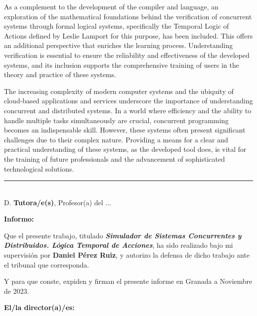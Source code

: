 As a complement to the development of the compiler and language, an exploration of the mathematical foundations behind the verification of concurrent systems through formal logical systems, specifically the Temporal Logic of Actions defined by Leslie Lamport for this purpose, has been included. This offers an additional perspective that enriches the learning process. Understanding verification is essential to ensure the reliability and effectiveness of the developed systems, and its inclusion supports the comprehensive training of users in the theory and practice of these systems.

The increasing complexity of modern computer systems and the ubiquity of cloud-based applications and services underscore the importance of understanding concurrent and distributed systems. In a world where efficiency and the ability to handle multiple tasks simultaneously are crucial, concurrent programming becomes an indispensable skill. However, these systems often present significant challenges due to their complex nature. Providing a means for a clear and practical understanding of these systems, as the developed tool does, is vital for the training of future professionals and the advancement of sophisticated technological solutions.



\cleardoublepage

\thispagestyle{empty}

\noindent\rule[-1ex]{\textwidth}{2pt}\\[4.5ex]

D. \textbf{Tutora/e(s)}, Profesor(a) del ...

\vspace{0.5cm}

\textbf{Informo:}

\vspace{0.5cm}

Que el presente trabajo, titulado \textit{\textbf{Simulador de Sistemas Concurrentes y Distribuidos. Lógica Temporal de Acciones}},
ha sido realizado bajo mi supervisión por \textbf{Daniel Pérez Ruiz}, y autorizo la defensa de dicho trabajo ante el tribunal
que corresponda.

\vspace{0.5cm}

Y para que conste, expiden y firman el presente informe en Granada a Noviembre de 2023.

\vspace{1cm}

\textbf{El/la director(a)/es: }

